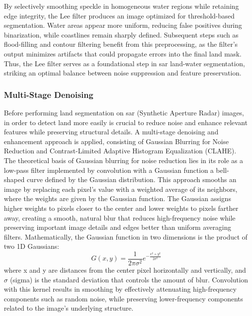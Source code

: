 \documentclass{article}
\begin{document}
	By selectively smoothing speckle in homogeneous water regions while retaining edge integrity, the Lee filter produces an image optimized for threshold-based segmentation. Water areas appear more uniform, reducing false positives during binarization, while coastlines remain sharply defined. Subsequent steps such as flood-filling and contour filtering benefit from this preprocessing, as the filter’s output minimizes artifacts that could propagate errors into the final land mask. Thus, the Lee filter serves as a foundational step in \acrshort{sar} land-water segmentation, striking an optimal balance between noise suppression and feature preservation.
	
	\subsubsection{Multi-Stage Denoising}
	
	
	Before performing land segmentation on \acrshort{sar} (Synthetic Aperture Radar) images, in order to detect land more easily is crucial to reduce noise and enhance relevant features while preserving structural details. A multi-stage denoising and enhancement approach is applied, consisting of Gaussian Blurring for Noise Reduction and Contrast-Limited Adaptive Histogram Equalization (CLAHE). The theoretical basis of Gaussian blurring for noise reduction lies in its role as a low-pass filter implemented by convolution with a Gaussian function a bell-shaped curve defined by the Gaussian distribution. This approach smooths an image by replacing each pixel’s value with a weighted average of its neighbors, where the weights are given by the Gaussian function. The Gaussian assigns higher weights to pixels closer to the center and lower weights to pixels farther away, creating a smooth, natural blur that reduces high-frequency noise while preserving important image details and edges better than uniform averaging filters. Mathematically, the Gaussian function in two dimensions is the product of two 1D Gaussians:$$G(x, y) = \frac{1}{2\pi\sigma^2} e^{-\frac{x^2 + y^2}{2\sigma^2}}$$
	where x and y are distances from the center pixel horizontally and vertically, and $\sigma$ (sigma) is the standard deviation that controls the amount of blur. Convolution with this kernel results in smoothing by effectively attenuating high-frequency components such as random noise, while preserving lower-frequency components related to the image’s underlying structure. \\
	
\end{document}
